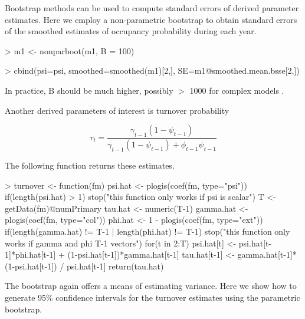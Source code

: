 \documentclass[12pt]{article}
\renewenvironment{Schunk}{\vspace{\topsep}}{\vspace{\topsep}}
\begin{document}
Bootstrap methods can be used to compute standard errors of derived
parameter estimates. Here we employ a non-parametric bootstrap to obtain
standard errors of the smoothed estimates of occupancy probability
during each year.

\begin{small}
\begin{Schunk}
\begin{Sinput}
> m1 <- nonparboot(m1, B = 100)
\end{Sinput}
\end{Schunk}
\begin{Schunk}
\begin{Sinput}
> cbind(psi=psi, smoothed=smoothed(m1)[2,], SE=m1@smoothed.mean.bsse[2,])
\end{Sinput}
\end{Schunk}
\end{small}


In practice, B should be much higher, possibly $>$ 1000 for complex
models .

Another derived parameters of interest is turnover probability

\[
\tau_t = \frac{\gamma_{t-1}(1-\psi_{t-1})}{\gamma_{t-1}(1-\psi_{t-1})
  + \phi_{t-1}\psi_{t-1}}
\]

The following function returns these estimates.

\begin{small}

\begin{Schunk}
\begin{Sinput}
> turnover <- function(fm) {
     psi.hat <- plogis(coef(fm, type="psi"))
     if(length(psi.hat) > 1)
         stop("this function only works if psi is scalar")
     T <- getData(fm)@numPrimary
     tau.hat <- numeric(T-1)
     gamma.hat <- plogis(coef(fm, type="col"))
     phi.hat <- 1 - plogis(coef(fm, type="ext"))
     if(length(gamma.hat) != T-1 | length(phi.hat) != T-1)
         stop("this function only works if gamma and phi T-1 vectors")
     for(t in 2:T) {
         psi.hat[t] <- psi.hat[t-1]*phi.hat[t-1] +
             (1-psi.hat[t-1])*gamma.hat[t-1]
         tau.hat[t-1] <- gamma.hat[t-1]*(1-psi.hat[t-1]) / psi.hat[t-1]
         }
     return(tau.hat)
     }
\end{Sinput}
\end{Schunk}
\end{small}



The bootstrap again offers a means of estimating variance. Here we
show how to generate 95\% confidence intervals for the turnover
estimates using the parametric bootstrap.
\end{document}
